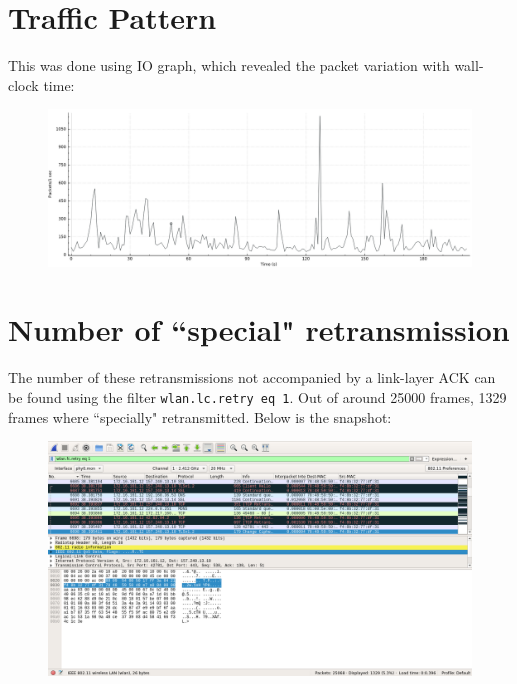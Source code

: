\documentclass{article}
\begin{document}
\section{Traffic Pattern}
\begin{flushleft}
This was done using IO graph, which revealed the packet variation with wall-clock time:
\begin{figure}[H]
\centering
\includegraphics[width=0.75\linewidth]{traffic-pattern-l2.png}
\end{figure}
\end{flushleft}

\section{Number of ``special" retransmission}
\begin{flushleft}
The number of these retransmissions not accompanied by a link-layer ACK can be found using the filter \texttt{wlan.lc.retry eq 1}. Out of around 25000 frames, 1329 frames where ``specially" retransmitted. Below is the snapshot:
\begin{figure}[H]
\centering
\includegraphics[width=0.85\linewidth]{snapshot-retrans.png}
\end{figure}
\end{flushleft}
\end{document}
